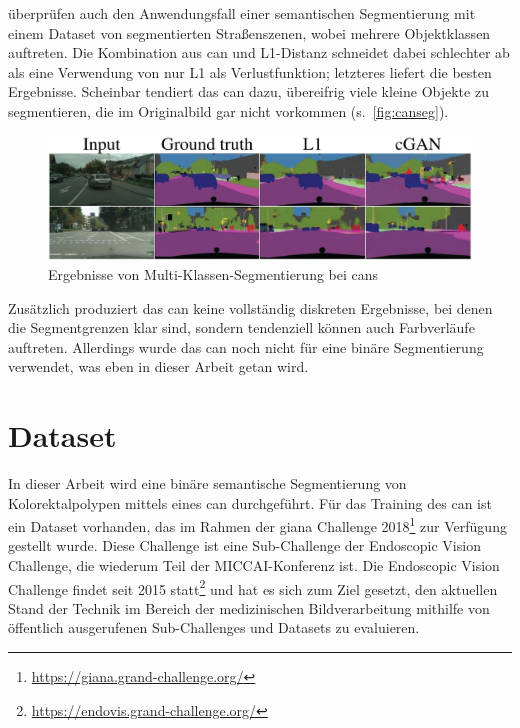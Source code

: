 \citeauthor{Isola.2017} überprüfen auch den Anwendungsfall einer semantischen Segmentierung mit einem Dataset von segmentierten Straßenszenen, wobei mehrere Objektklassen auftreten.
Die Kombination aus \gls{can} und L1-Distanz schneidet dabei schlechter ab als eine Verwendung von nur L1 als Verlustfunktion; letzteres liefert die besten Ergebnisse.
Scheinbar tendiert das \gls{can} dazu, übereifrig viele kleine Objekte zu segmentieren, die im Originalbild gar nicht vorkommen (s.~\autoref{fig:canseg}).

\begin{figure}
	\centering
	\includegraphics[width=0.95\linewidth]{img/can_seg}
	\caption[Ergebnisse von Multi-Klassen-Segmentierung bei \glspl{can}]{Ergebnisse von Multi-Klassen-Segmentierung bei \glspl{can}~\cite{Isola.2017}}
	\label{fig:canseg}
\end{figure}

Zusätzlich produziert das \gls{can} keine vollständig diskreten Ergebnisse, bei denen die Segmentgrenzen klar sind, sondern tendenziell können auch Farbverläufe auftreten.
Allerdings wurde das \gls{can} noch nicht für eine binäre Segmentierung verwendet, was eben in dieser Arbeit getan wird.



\section{Dataset}

In dieser Arbeit wird eine binäre semantische Segmentierung von Kolorektalpolypen mittels eines \gls{can} durchgeführt.
Für das Training des \gls{can} ist ein Dataset vorhanden, das im Rahmen der \gls{giana} Challenge 2018\footnote{\url{https://giana.grand-challenge.org/}} zur Verfügung gestellt wurde.
Diese Challenge ist eine Sub-Challenge der Endoscopic Vision Challenge, die wiederum Teil der MICCAI-Konferenz ist.
Die Endoscopic Vision Challenge findet seit 2015 statt\footnote{\url{https://endovis.grand-challenge.org/}} und hat es sich zum Ziel gesetzt, den aktuellen Stand der Technik im Bereich der medizinischen Bildverarbeitung mithilfe von öffentlich ausgerufenen Sub-Challenges und Datasets zu evaluieren.

